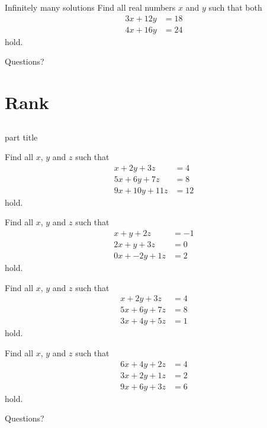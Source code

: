 \documentclass{beamer}
\begin{document}
\begin{frame}{Infinitely many solutions}
  Find all real numbers $x$ and $y$ such that both
  \begin{align*}
    3x+12y&=18\\
    4x+16y&=24
  \end{align*}
  hold.
\end{frame}

\begin{frame}
Questions?
\end{frame}

\section{Rank}
\subsection{}
\begin{frame}
    \begin{beamercolorbox}[sep=12pt,center]{part title}
      \insertsection\par
    \end{beamercolorbox}
\end{frame}

\begin{frame}
  Find all $x$, $y$ and $z$ such that
  \begin{align*}
    x+2y+3z&=4\\
    5x+6y+7z&=8\\
    9x+10y+11z&=12
  \end{align*}
  hold.
\end{frame}

\begin{frame}
  Find all $x$, $y$ and $z$ such that
  \begin{align*}
    x+y+2z&=-1\\
    2x+y+3z&=0\\
    0x+-2y+1z&=2
  \end{align*}
  hold.
\end{frame}

\begin{frame}
  Find all $x$, $y$ and $z$ such that
  \begin{align*}
    x+2y+3z&=4\\
    5x+6y+7z&=8\\
    3x+4y+5z&=1
  \end{align*}
  hold.
\end{frame}

\begin{frame}
  Find all $x$, $y$ and $z$ such that
  \begin{align*}
    6x+4y+2z&=4\\
    3x+2y+1z&=2\\
    9x+6y+3z&=6
  \end{align*}
  hold.
\end{frame}

\begin{frame}
  Questions?
\end{frame}
\end{document}
